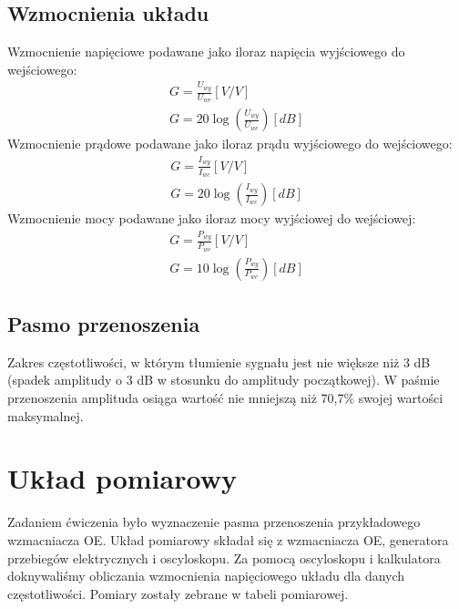 \documentclass[a4paper,12pt]{article}
\begin{document}
\subsection{Wzmocnienia układu}
Wzmocnienie napięciowe podawane jako iloraz napięcia wyjściowego do wejściowego:
\begin{gather*}
        G = \frac{U_{wy}}{U_{we}} [V/V] \\
        G = 20\log(\frac{U_{wy}}{U_{we}} ) [dB]
\end{gather*}
Wzmocnienie prądowe podawane jako iloraz prądu wyjściowego do wejściowego:
\begin{gather*}
    G = \frac{I_{wy}}{I_{we}} [V/V] \\
    G = 20\log(\frac{I_{wy}}{I_{we}} ) [dB]
\end{gather*}
Wzmocnienie mocy podawane jako iloraz mocy wyjściowej do wejściowej:
\begin{gather*}
    G = \frac{P_{wy}}{P_{we}} [V/V] \\
    G = 10\log(\frac{P_{wy}}{P_{we}} ) [dB]
\end{gather*}

\subsection{Pasmo przenoszenia}
Zakres częstotliwości, w którym tłumienie sygnału jest nie większe niż 3 dB
(spadek amplitudy o 3 dB w stosunku do amplitudy początkowej).
W paśmie przenoszenia amplituda osiąga wartość nie mniejszą niż 70,7\% swojej wartości maksymalnej.

\section{Układ pomiarowy}
Zadaniem ćwiczenia było wyznaczenie pasma przenoszenia przykładowego wzmacniacza OE.
Układ pomiarowy składał się z wzmacniacza OE, generatora przebiegów elektrycznych i oscyloskopu.
Za pomocą oscyloskopu i kalkulatora doknywaliśmy obliczania wzmocnienia napięciowego układu dla danych częstotliwości. 
Pomiary zostały zebrane w tabeli pomiarowej.
\end{document}
